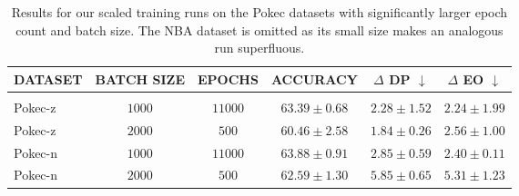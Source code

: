 \begin{table}[H]
    \caption{Results for our scaled training runs on the Pokec datasets with significantly larger epoch count and batch size. The NBA dataset is omitted as its small size makes an analogous run superfluous.}
    
    \label{tab:scaled-results}
    \centering
    \begin{tabular}{lccccc}
        \bf DATASET & 
        \textbf{BATCH SIZE} & 
        \bf EPOCHS &
        \bf ACCURACY &
        $\Delta$ \bf DP $\downarrow$ & 
        $\Delta$ \bf EO $\downarrow$\\
        \hline\\

        Pokec-z & $1000$ & $11000$ & $63.39 \pm 0.68$ & $2.28 \pm 1.52$ & $2.24 \pm 1.99$\\

        Pokec-z & $2000$ & $500$ & $60.46 \pm 2.58$ & $1.84 \pm 0.26$ & $2.56 \pm 1.00$\\

        Pokec-n & $1000$ & $11000$ & $63.88 \pm 0.91$ & $2.85 \pm 0.59$ & $2.40 \pm 0.11$\\

        Pokec-n & $2000$ & $500$ & $62.59 \pm 1.30$ & $5.85 \pm 0.65$ & $5.31 \pm 1.23$\\
    \end{tabular}
\end{table}